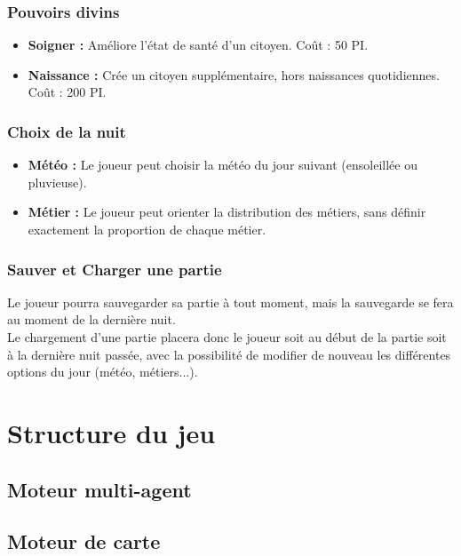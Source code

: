 \documentclass[a4paper]{article}
\newcommand{\alinea}{\hspace*{0.5cm}}
\begin{document}
        \subsubsection{Pouvoirs divins}
          \begin{itemize} \small
            \item \textbf{Soigner :} Améliore l'état de santé d'un citoyen. Coût : 50 PI.
            \item \textbf{Naissance :} Crée un citoyen supplémentaire, hors naissances quotidiennes. Coût : 200 PI.
          \end{itemize} \normalsize

        \subsubsection{Choix de la nuit}
          \begin{itemize} \small
            \item \textbf{Météo :} Le joueur peut choisir la météo du jour suivant (ensoleillée ou pluvieuse).
            \item \textbf{Métier :} Le joueur peut orienter la distribution des métiers, sans définir exactement la proportion de chaque métier.
          \end{itemize} \normalsize
		  
        \subsubsection{Sauver et Charger une partie}
          \alinea Le joueur pourra sauvegarder sa partie à tout moment, mais la sauvegarde se fera au moment de la dernière nuit.\\
          Le chargement d'une partie placera donc le joueur soit au début de la partie soit à la dernière nuit passée, avec la possibilité de modifier de nouveau les différentes options du jour (météo, métiers...).
    
    \section{Structure du jeu}
    
      \subsection{Moteur multi-agent}
        
      \subsection{Moteur de carte}
    
\end{document}
